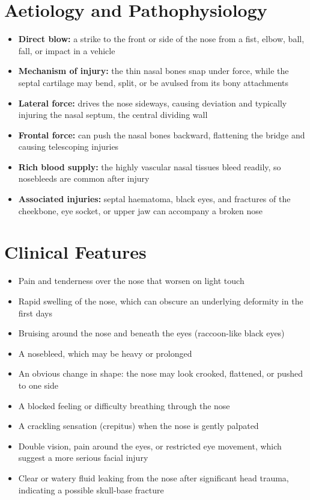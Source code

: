 \section*{Aetiology and Pathophysiology}
\begin{itemize}
    \item \textbf{Direct blow:} a strike to the front or side of the nose from a fist, elbow, ball, fall, or impact in a vehicle
    \item \textbf{Mechanism of injury:} the thin nasal bones snap under force, while the septal cartilage may bend, split, or be avulsed from its bony attachments
    \item \textbf{Lateral force:} drives the nose sideways, causing deviation and typically injuring the nasal septum, the central dividing wall
    \item \textbf{Frontal force:} can push the nasal bones backward, flattening the bridge and causing telescoping injuries
    \item \textbf{Rich blood supply:} the highly vascular nasal tissues bleed readily, so nosebleeds are common after injury
    \item \textbf{Associated injuries:} septal haematoma, black eyes, and fractures of the cheekbone, eye socket, or upper jaw can accompany a broken nose
\end{itemize}

\section*{Clinical Features}
\begin{itemize}
    \item Pain and tenderness over the nose that worsen on light touch
    \item Rapid swelling of the nose, which can obscure an underlying deformity in the first days
    \item Bruising around the nose and beneath the eyes (raccoon-like black eyes)
    \item A nosebleed, which may be heavy or prolonged
    \item An obvious change in shape: the nose may look crooked, flattened, or pushed to one side
    \item A blocked feeling or difficulty breathing through the nose
    \item A crackling sensation (crepitus) when the nose is gently palpated
    \item Double vision, pain around the eyes, or restricted eye movement, which suggest a more serious facial injury
    \item Clear or watery fluid leaking from the nose after significant head trauma, indicating a possible skull-base fracture
\end{itemize}

